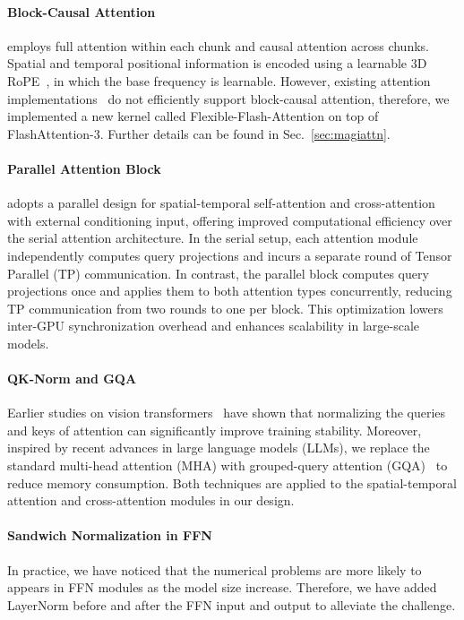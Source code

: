 \paragraph{Block-Causal Attention}
\magi employs full attention within each chunk and causal attention across chunks. Spatial and temporal positional information is encoded using a learnable 3D RoPE~\citep{su2024roformer}, in which the base frequency is learnable. However, existing attention implementations~\citep{dao2022flashattention,dao2023flashattention} do not efficiently support block-causal attention, therefore, we implemented a new kernel called Flexible-Flash-Attention on top of FlashAttention-3. Further details can be found in Sec.~\ref{sec:magiattn}.
 
\paragraph{Parallel Attention Block}
\magi adopts a parallel design for spatial-temporal self-attention and cross-attention with external conditioning input, offering improved computational efficiency over the serial attention architecture. In the serial setup, each attention module independently computes query projections and incurs a separate round of Tensor Parallel (TP) communication. In contrast, the parallel block computes  query projections once and applies them to both attention types concurrently, reducing TP communication from two rounds to one per block. This optimization lowers inter-GPU synchronization overhead and enhances scalability in large-scale models.

\paragraph{QK-Norm and GQA} 
Earlier studies on vision transformers~\citep{liu2022swin,dehghani2023scaling} have shown that normalizing the queries and keys of attention can significantly improve training stability. Moreover, inspired by recent advances in large language models (LLMs), we replace the standard multi-head attention (MHA) with grouped-query attention (GQA)~\citep{ainslie2023gqa} to reduce memory consumption. Both techniques are applied to the spatial-temporal attention and cross-attention modules in our design. 

\paragraph{Sandwich Normalization in FFN} In practice, we have noticed that the numerical problems are more likely to appears in FFN modules as the model size increase. Therefore, we have added LayerNorm before and after the FFN input and output to alleviate the challenge.

